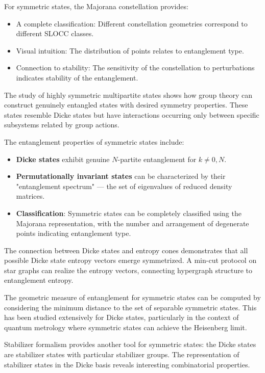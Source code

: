 \documentclass[%
 amsmath,amssymb,
 aps,
rmp,
]{revtex4-2}
\begin{document}
For symmetric states, the Majorana constellation provides:
\begin{itemize}
	\item A complete classification: Different constellation geometries correspond to different SLOCC classes.
	\item Visual intuition: The distribution of points relates to entanglement type.
	\item Connection to stability: The sensitivity of the constellation to perturbations indicates stability of the entanglement.
\end{itemize}

The study of highly symmetric multipartite states \cite{burchardt2021} shows how group theory can construct genuinely entangled states with desired symmetry properties. These states resemble Dicke states but have interactions occurring only between specific subsystems related by group actions.

The entanglement properties of symmetric states include:
\begin{itemize}
	\item \textbf{Dicke states} exhibit genuine $N$-partite entanglement for $k \neq 0, N$.
	\item \textbf{Permutationally invariant states} can be characterized by their "entanglement spectrum" --- the set of eigenvalues of reduced density matrices.
	\item \textbf{Classification}: Symmetric states can be completely classified using the Majorana representation, with the number and arrangement of degenerate points indicating entanglement type.
\end{itemize}

The connection between Dicke states and entropy cones demonstrates that all possible Dicke state entropy vectors emerge symmetrized. A min-cut protocol on star graphs can realize the entropy vectors, connecting hypergraph structure to entanglement entropy.

The geometric measure of entanglement for symmetric states can be computed by considering the minimum distance to the set of separable symmetric states. This has been studied extensively for Dicke states, particularly in the context of quantum metrology where symmetric states can achieve the Heisenberg limit.

Stabilizer formalism provides another tool for symmetric states: the Dicke states are stabilizer states with particular stabilizer groups. The representation of stabilizer states in the Dicke basis reveals interesting combinatorial properties.
\end{document}
